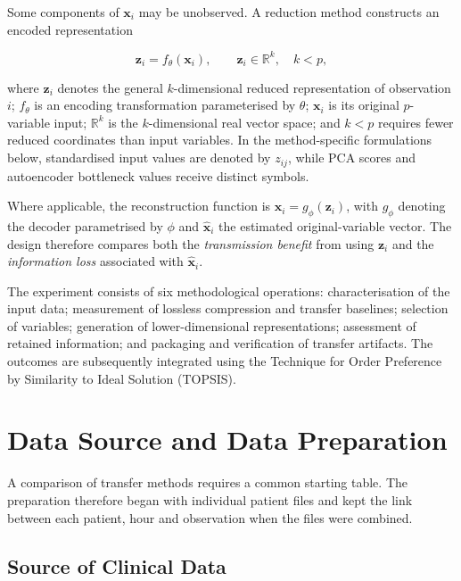 \noindent Some components of \(\boldsymbol{x}_i\) may be unobserved. A reduction
method constructs an encoded representation

\[
\boldsymbol{z}_i=f_{\theta}(\boldsymbol{x}_i), \qquad
\boldsymbol{z}_i\in\mathbb{R}^{k},\quad k<p,\tag{3.2.2}
\]

\noindent where \(\boldsymbol{z}_i\) denotes the general \(k\)-dimensional reduced
representation of observation \(i\); \(f_{\theta}\) is an encoding
transformation parameterised by \(\theta\); \(\boldsymbol{x}_i\) is its
original \(p\)-variable input; \(\mathbb{R}^{k}\) is the
\(k\)-dimensional real vector space; and \(k<p\) requires fewer reduced
coordinates than input variables. In the method-specific formulations
below, standardised input values are denoted by \(z_{ij}\), while PCA
scores and autoencoder bottleneck values receive distinct symbols.

\noindent Where applicable, the reconstruction function is
\(\hat{\boldsymbol{x}}_i=g_{\phi}(\boldsymbol{z}_i)\), with \(g_{\phi}\)
denoting the decoder parametrised by \(\phi\) and
\(\hat{\boldsymbol{x}}_i\) the estimated original-variable vector. The
design therefore compares both the \emph{transmission benefit} from
using \(\boldsymbol{z}_i\) and the \emph{information loss} associated
with \(\hat{\boldsymbol{x}}_i\).

\noindent The experiment consists of six methodological operations:
characterisation of the input data; measurement of lossless compression
and transfer baselines; selection of variables; generation of
lower-dimensional representations; assessment of retained information;
and packaging and verification of transfer artifacts. The outcomes are
subsequently integrated using the Technique for Order Preference by
Similarity to Ideal Solution (TOPSIS).

\section{Data Source and Data Preparation}\label{data-source-and-data-preparation}

\noindent A comparison of transfer methods requires a common starting table. The preparation therefore began with individual patient files and kept the link between each patient, hour and observation when the files were combined.

\subsection{Source of Clinical Data}\label{source-of-clinical-data}

